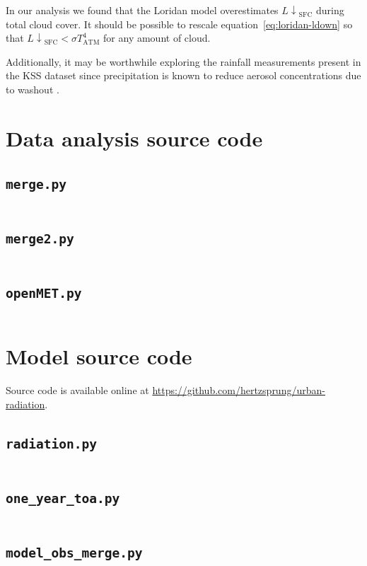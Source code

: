 \documentclass[a4paper,titlepage, twoside]{report}
\newcommand\Ldownsfc{{L\!\!\downarrow}_\mathrm{SFC}}
\begin{document}
In our analysis we found that the Loridan model overestimates $\Ldownsfc$ during total cloud cover.  It should be possible to rescale equation~\ref{eq:loridan-ldown} so that $\Ldownsfc<\sigma T_\mathrm{ATM}^4$ for any amount of cloud.

Additionally, it may be worthwhile exploring the rainfall measurements present in the KSS dataset since precipitation is known to reduce aerosol concentrations due to washout \parencite{loosmore}.

\printbibliography

\appendix
\chapter{Data analysis source code}
\section{\texttt{merge.py}}
\inputminted[fontsize=\footnotesize, tabsize=4]{python}{johns_code/merge.py}

\section{\texttt{merge2.py}}
\inputminted[fontsize=\footnotesize, tabsize=4]{python}{johns_code/merge2.py}

\section{\texttt{openMET.py}}
\inputminted[fontsize=\footnotesize, tabsize=4]{python}{johns_code/openMET.py}

\chapter{Model source code}
Source code is available online at \url{https://github.com/hertzsprung/urban-radiation}.

\section{\texttt{radiation.py}}
\inputminted[fontsize=\footnotesize, tabsize=4]{python}{radiation.py}

\section{\texttt{one\_year\_toa.py}}
\inputminted[fontsize=\footnotesize, tabsize=4]{python}{one_year_toa.py}

\section{\texttt{model\_obs\_merge.py}}
\inputminted[fontsize=\footnotesize, tabsize=4]{python}{model_obs_merge.py}
\end{document}
